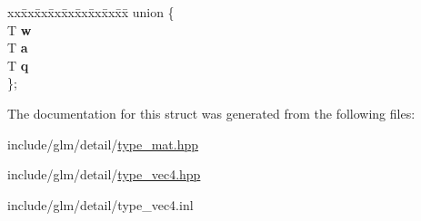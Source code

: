 \begin{DoxyCompactItemize}
\begin{tabbing}
\end{tabbing}\item 
\mbox{\label{structglm_1_1tvec4_a558006772d5f08d21d10eece77f0f156}} 
\begin{tabbing}
xx\=xx\=xx\=xx\=xx\=xx\=xx\=xx\=xx\=\kill
union \{\\
\>T {\bfseries w}\\
\>T {\bfseries a}\\
\>T {\bfseries q}\\
\}; \\

\end{tabbing}\end{DoxyCompactItemize}


The documentation for this struct was generated from the following files\+:\begin{DoxyCompactItemize}
\item 
include/glm/detail/\hyperlink{type__mat_8hpp}{type\+\_\+mat.\+hpp}\item 
include/glm/detail/\hyperlink{type__vec4_8hpp}{type\+\_\+vec4.\+hpp}\item 
include/glm/detail/type\+\_\+vec4.\+inl\end{DoxyCompactItemize}
